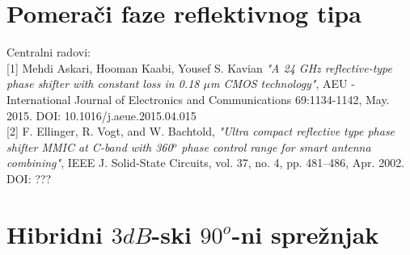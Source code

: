 \documentclass[journal,twocolumn,letterpaper]{IEEEJERM}
\begin{document}
\begin{thebibliography}{9}






\end{thebibliography}


\twocolumn[
\begin{@twocolumnfalse}

\newpage

\end{@twocolumnfalse}]

\section{Pomerači faze reflektivnog tipa}

Centralni radovi: \\

[1] Mehdi Askari, Hooman Kaabi, Yousef S. Kavian \textit{"A 24 GHz reflective-type phase shifter with constant loss in 0.18 $\mu$m CMOS technology"}, AEU - International Journal of Electronics and Communications 69:1134-1142, May. 2015. DOI: 10.1016/j.aeue.2015.04.015 \\

[2] F. Ellinger, R. Vogt, and W. Bachtold, \textit{"Ultra compact reflective type phase shifter MMIC at C-band with 360$^o$ phase control range for smart antenna combining"}, IEEE J. Solid-State Circuits, vol. 37, no. 4, pp. 481–486, Apr. 2002. DOI: ??? \\


\section{Hibridni $3dB$-ski $90^o$-ni sprežnjak}
\end{document}

